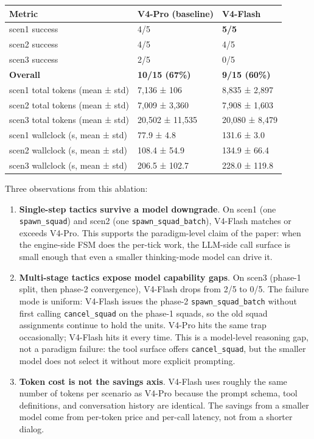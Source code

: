 \documentclass[
  journal]{IEEEtran}
\providecommand{\tightlist}{%
  \setlength{\itemsep}{0pt}\setlength{\parskip}{0pt}}
\begin{document}
\begin{longtable}[]{@{}lll@{}}
\toprule\noalign{}
Metric & V4-Pro (baseline) & V4-Flash \\
\midrule\noalign{}
\endhead
\bottomrule\noalign{}
\endlastfoot
scen1 success & 4/5 & \textbf{5/5} \\
scen2 success & 4/5 & 4/5 \\
scen3 success & 2/5 & 0/5 \\
\textbf{Overall} & \textbf{10/15 (67\%)} & \textbf{9/15 (60\%)} \\
scen1 total tokens (mean ± std) & 7,136 ± 106 & 8,835 ± 2,897 \\
scen2 total tokens (mean ± std) & 7,009 ± 3,360 & 7,908 ± 1,603 \\
scen3 total tokens (mean ± std) & 20,502 ± 11,535 & 20,080 ± 8,479 \\
scen1 wallclock (s, mean ± std) & 77.9 ± 4.8 & 131.6 ± 3.0 \\
scen2 wallclock (s, mean ± std) & 108.4 ± 54.9 & 134.9 ± 66.4 \\
scen3 wallclock (s, mean ± std) & 206.5 ± 102.7 & 228.0 ± 119.8 \\
\end{longtable}

Three observations from this ablation:

\begin{enumerate}
\def\labelenumi{\arabic{enumi}.}
\tightlist
\item
  \textbf{Single-step tactics survive a model downgrade}. On scen1 (one
  \texttt{spawn\_squad}) and scen2 (one \texttt{spawn\_squad\_batch}),
  V4-Flash matches or exceeds V4-Pro. This supports the paradigm-level
  claim of the paper: when the engine-side FSM does the per-tick work,
  the LLM-side call surface is small enough that even a smaller
  thinking-mode model can drive it.
\item
  \textbf{Multi-stage tactics expose model capability gaps}. On scen3
  (phase-1 split, then phase-2 convergence), V4-Flash drops from 2/5 to
  0/5. The failure mode is uniform: V4-Flash issues the phase-2
  \texttt{spawn\_squad\_batch} without first calling
  \texttt{cancel\_squad} on the phase-1 squads, so the old squad
  assignments continue to hold the units. V4-Pro hits the same trap
  occasionally; V4-Flash hits it every time. This is a model-level
  reasoning gap, not a paradigm failure: the tool surface offers
  \texttt{cancel\_squad}, but the smaller model does not select it
  without more explicit prompting.
\item
  \textbf{Token cost is not the savings axis}. V4-Flash uses roughly the
  same number of tokens per scenario as V4-Pro because the prompt
  schema, tool definitions, and conversation history are identical. The
  savings from a smaller model come from per-token price and per-call
  latency, not from a shorter dialog.
\end{enumerate}
\end{document}
